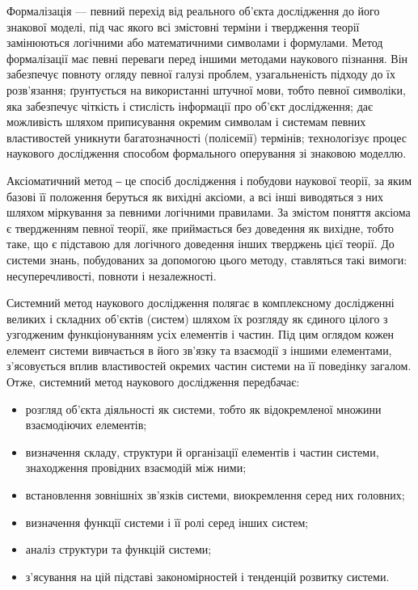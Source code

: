 Формалізація --- певний перехід від реального об’єкта дослідження до його
знакової моделі, під час якого всі змістовні терміни і твердження теорії
замінюються логічними або математичними символами і формулами. Метод
формалізації має певні переваги перед іншими методами наукового пізнання.
Він забезпечує повноту огляду певної галузі проблем, узагальненість підходу
до їх розв’язання; ґрунтується на використанні штучної мови, тобто певної
символіки, яка забезпечує чіткість і стислість інформації про об’єкт
дослідження; дає можливість шляхом приписування окремим символам і
системам певних властивостей уникнути багатозначності (полісемії) термінів;
технологізує процес наукового дослідження способом формального оперування
зі знаковою моделлю.

Аксіоматичний метод ‒ це спосіб дослідження і побудови наукової теорії, за
яким базові її положення беруться як вихідні аксіоми, а всі інші виводяться з
них шляхом міркування за певними логічними правилами. За змістом поняття
аксіома є твердженням певної теорії, яке приймається без доведення як вихідне,
тобто таке, що є підставою для логічного доведення інших тверджень цієї
теорії. До системи знань, побудованих за допомогою цього методу, ставляться
такі вимоги: несуперечливості, повноти і незалежності.

Системний метод наукового дослідження полягає в комплексному
дослідженні великих і складних об’єктів (систем) шляхом їх розгляду як
єдиного цілого з узгодженим функціонуванням усіх елементів і частин. Під цим
оглядом кожен елемент системи вивчається в його зв’язку та взаємодії з
іншими елементами, з’ясовується вплив властивостей окремих частин системи
на її поведінку загалом. Отже, системний метод наукового дослідження
передбачає:
\begin{itemize}
	\item розгляд об’єкта діяльності як системи, тобто як відокремленої множини
	взаємодіючих елементів;
	
	\item визначення складу, структури й організації елементів і частин системи,	
	знаходження провідних взаємодій між ними;

	\item встановлення зовнішніх зв’язків системи, виокремлення серед них
	головних;

	\item визначення функції системи і її ролі серед інших систем;

	\item аналіз структури та функцій системи;

	\item з’ясування на цій підставі закономірностей і тенденцій розвитку системи.
\end{itemize}

